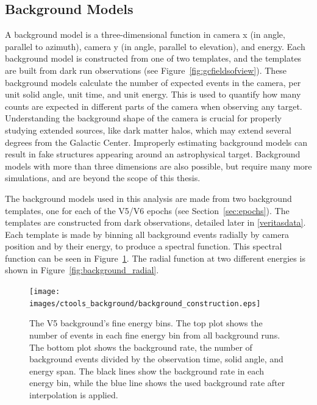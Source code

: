 {  \FloatBarrier
  
  \subsection{Background Models}\label{background_production}
  
    A background model is a three-dimensional function in camera x (in angle, parallel to azimuth), camera y (in angle, parallel to elevation), and energy.
    Each background model is constructed from one of two templates, and the templates are built from dark run observations (see Figure~\ref{fig:gcfieldsofview}).
    These background models calculate the number of expected events in the camera, per unit solid angle, unit time, and unit energy.
    This is used to quantify how many counts are expected in different parts of the camera when observing any target.
    Understanding the background shape of the camera is crucial for properly studying extended sources, like dark matter halos, which may extend several degrees from the Galactic Center.
    Improperly estimating background models can result in fake structures appearing around an astrophysical target.
    Background models with more than three dimensions are also possible, but require many more simulations, and are beyond the scope of this thesis.
    
    The background models used in this analysis are made from two background templates, one for each of the V5/V6 epochs (see Section~\ref{sec:epochs}).
    The templates are constructed from dark observations, detailed later in \ref{veritasdata}.
    Each template is made by binning all background events radially by camera position and by their energy, to produce a spectral function.
    This spectral function can be seen in Figure~\ref{fig:background_profile}.
    The radial function at two different energies is shown in Figure~\ref{fig:background_radial}.

    \begin{figure}[!p]
      \centering
      \texttt{[image: images/ctools\_background/background\_construction.eps]}
      \caption[CTOOLS Background Fine Energy Bins]{
        The V5 background's fine energy bins.
        The top plot shows the number of events in each fine energy bin from all background runs.
        The bottom plot shows the background rate, the number of background events divided by the observation time, solid angle, and energy span.
        The black lines show the background rate in each energy bin, while the blue line shows the used background rate after interpolation is applied.
      }
      \label{fig:background_profile}
    \end{figure}

}
